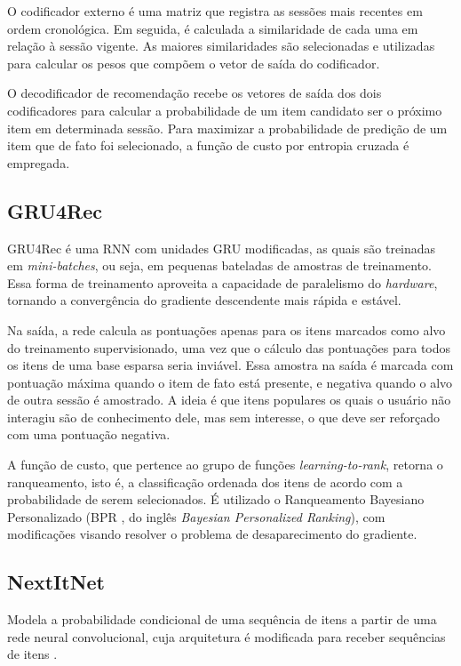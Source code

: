 O codificador externo é uma matriz que registra as sessões mais recentes em
ordem cronológica. Em seguida, é calculada a similaridade de cada uma em relação
à sessão vigente. As maiores similaridades são selecionadas e utilizadas para
calcular os pesos que compõem o vetor de saída do codificador.

O decodificador de recomendação recebe os vetores de saída dos dois
codificadores para calcular a probabilidade de um item candidato ser o próximo
item em determinada sessão. Para maximizar a probabilidade de predição de um
item que de fato foi selecionado, a função de custo por entropia cruzada é
empregada.

\subsection{GRU4Rec}
GRU4Rec  \cite{gru4rec_1, gru4rec_2} é uma RNN com unidades GRU
modificadas, as quais são treinadas em \textit{mini-batches}, ou seja, em
pequenas bateladas de amostras de treinamento. Essa forma de treinamento
aproveita a capacidade de paralelismo do \textit{hardware}, tornando a
convergência do gradiente descendente mais rápida e estável.

Na saída, a rede calcula as pontuações apenas para os itens marcados como
alvo do treinamento supervisionado, uma vez que o cálculo das
pontuações para todos os itens de uma base esparsa seria inviável. Essa amostra
na saída é marcada com pontuação máxima quando o item de fato está presente, e
negativa quando o alvo de outra sessão é amostrado. A ideia é que itens
populares os quais o usuário não interagiu são de conhecimento dele, mas sem
interesse, o que deve ser reforçado com uma pontuação negativa.

A função de custo, que pertence ao grupo de funções \textit{learning-to-rank},
retorna o ranqueamento, isto é, a classificação ordenada dos itens de acordo com
a probabilidade de serem selecionados. É utilizado o Ranqueamento Bayesiano
Personalizado (BPR \cite{rendle2009}, do inglês \textit{Bayesian Personalized
Ranking}), com modificações visando resolver o problema de desaparecimento do
gradiente. 

\subsection{NextItNet}
Modela a probabilidade condicional de uma sequência de itens a partir de uma
rede neural convolucional, cuja arquitetura é modificada para receber sequências de
itens \cite{nextitnet}.

